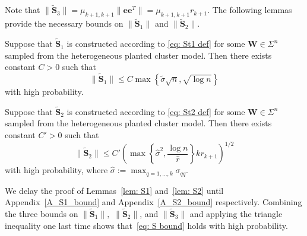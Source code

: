 \documentclass[twoside,11pt]{article}
\newcommand{\St}{\bs{\tilde S}}
\newcommand{\bs}{\boldsymbol}
\newcommand{\W}{\bs {W}}
\newcommand{\0}{\bs{0}}
\newcommand{\rbra}[1]{\ensuremath{\left( #1 \right)}} %
\newcommand{\bra}[1]{\ensuremath{\left\{ #1 \right\}}} %
\begin{document}
{Note that $\|\St_3\| = \mu_{k+1, k+1}\|\bs{e}\bs{e}^T\|=\mu_{k+1, k+1} r_{k+1}$.
The following lemmas provide the necessary bounds on $\|\St_1\|$ and $\|\St_2\|$.

\begin{lemma} \label{lem: S1}
	Suppose that \(\St_1\) is constructed according to \eqref{eq: St1 def}
	for some \(\W\in \Sigma^n\) sampled from the heterogeneous planted cluster model.
	Then there exists constant $C > 0$ such that
	\begin{equation} \label{eq: S1 bound}
	\|\St_1\| \le C   \max  \bra {\tilde \sigma\sqrt{n},  \sqrt{\log n}}
	\end{equation}
	with high probability.
\end{lemma}

\begin{lemma} \label{lem: S2}
	Suppose that \(\St_2\) is constructed according to \eqref{eq: St2 def}
	for some \(\W\in \Sigma^n\) sampled from the heterogeneous planted cluster model.
	Then there exists constant $C'> 0$ such that
	\begin{equation} \label{eq: S2 bound}
		\|\St_2 \| \le C' \rbra{ \max \bra{\hat\sigma^2, \frac{\log n}{\hat r} } k r_{k+1} }^{1/2}
	\end{equation}
	with high probability, where $\hat \sigma := \max_{q=1,\dots, k} \sigma_{qq}$.
\end{lemma}

We delay the proof of Lemmas~\ref{lem: S1} and~\ref{lem: S2} until Appendix~\ref{A_S1_bound}
and Appendix~\ref{A_S2_bound} respectively.
Combining the three bounds on \(\|\St_1\|,\) \(\|\St_2\|\), and \(\|\St_3\|\) and
applying the triangle inequality one last time shows that~\eqref{eq: S bound} holds
with high probability.


}
\end{document}

